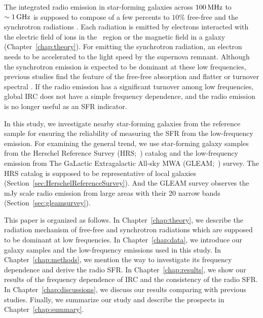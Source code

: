 The integrated radio emission in star-forming galaxies across $100\,\mathrm{MHz}$ to $\sim 1\,\mathrm{GHz}$ is supposed to compose of a few percents to $10\%$ free-free and the synchrotron radiations \citep{Condon1992a}.
Each radiation is emitted by electrons interacted with the electric field of ions in the \ih~region or the magnetic field in a galaxy (Chapter~\ref{chap:theory}).
For emitting the synchrotron radiation, an electron needs to be accelerated to the light speed by the supernova remnant.
Although the synchrotron emission is expected to be dominant at these low frequencies, previous studies find the feature of the free-free absorption and flatter or turnover spectral \citep{Schober2017, Chyzy2018}.
If the radio emission has a significant turnover among low frequencies, global IRC does not have a simple frequency dependence, and the radio emission is no longer useful as an SFR indicator.

In this study, we investigate nearby star-forming galaxies from the reference sample for ensuring the reliability of measuring the SFR from the low-frequency emission.
For examining the general trend, we use star-forming galaxy samples from the Herschel Reference Survey (HRS;~\citealt{Boselli2010}) catalog and the low-frequency emission from The GaLactic Extragalactic All-sky MWA (GLEAM;~\citealt{Hurley-Walker2017a}) survey.
The HRS catalog is supposed to be representative of local galaxies (Section~\ref{sec:HerschelReferenceSurvey}).
And the GLEAM survey observes the mJy scale radio emission from large areas with their 20 narrow bands (Section~\ref{sec:gleamsurvey}).

This paper is organized as follows.
In Chapter~\ref{chap:theory}, we describe the radiation mechanism of free-free and synchrotron radiations which are supposed to be dominant at low frequencies.
In Chapter~\ref{chap:data}, we introduce our galaxy samples and the low-frequency emissions used in this study.
In Chapter~\ref{chap:methods}, we mention the way to investigate its frequency dependence and derive the radio SFR\@.
In Chapter~\ref{chap:results}, we show our results of the frequency dependence of IRC and the consistency of the radio SFR\@.
In Chapter~\ref{chap:discussions}, we discuss our results comparing with previous studies.
Finally, we summarize our study and describe the prospects in Chapter~\ref{chap:summary}.



